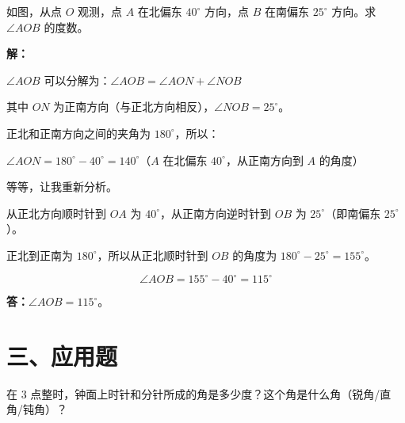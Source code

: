 \documentclass[12pt, a4paper]{ctexart}
\begin{document}
\begin{examplebox}[【例题7】方位角的应用]
如图，从点 $O$ 观测，点 $A$ 在北偏东 $40^\circ$ 方向，点 $B$ 在南偏东 $25^\circ$ 方向。求 $\angle AOB$ 的度数。

\begin{center}
\end{center}
\end{examplebox}

\textbf{解：}

$\angle AOB$ 可以分解为：$\angle AOB=\angle AON+\angle NOB$

其中 $ON$ 为正南方向（与正北方向相反），$\angle NOB=25^\circ$。

正北和正南方向之间的夹角为 $180^\circ$，所以：

$\angle AON=180^\circ-40^\circ=140^\circ$（$A$ 在北偏东 $40^\circ$，从正南方向到 $A$ 的角度）

等等，让我重新分析。

从正北方向顺时针到 $OA$ 为 $40^\circ$，从正南方向逆时针到 $OB$ 为 $25^\circ$（即南偏东 $25^\circ$）。

正北到正南为 $180^\circ$，所以从正北顺时针到 $OB$ 的角度为 $180^\circ-25^\circ=155^\circ$。

$$\angle AOB=155^\circ-40^\circ=115^\circ$$

\textbf{答：}$\angle AOB=115^\circ$。

\section*{\textcolor{apppurple}{三、应用题}}

\begin{appbox}[【应用1】时钟角度问题]
在 $3$ 点整时，钟面上时针和分针所成的角是多少度？这个角是什么角（锐角/直角/钝角）？
\end{appbox}
\end{document}
